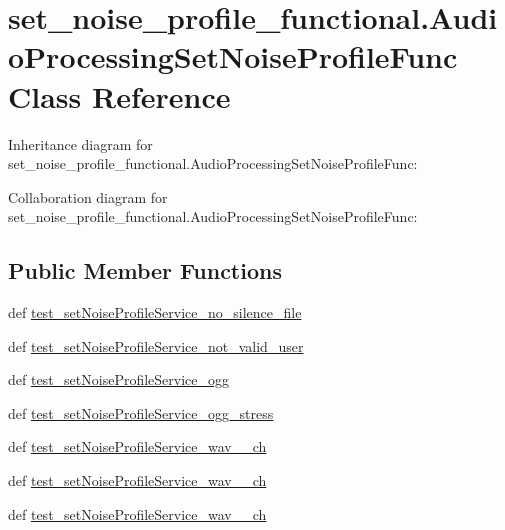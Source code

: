\hypertarget{classset__noise__profile__functional_1_1AudioProcessingSetNoiseProfileFunc}{\section{set\-\_\-noise\-\_\-profile\-\_\-functional.\-Audio\-Processing\-Set\-Noise\-Profile\-Func Class Reference}
\label{classset__noise__profile__functional_1_1AudioProcessingSetNoiseProfileFunc}
}


Inheritance diagram for set\-\_\-noise\-\_\-profile\-\_\-functional.\-Audio\-Processing\-Set\-Noise\-Profile\-Func\-:


Collaboration diagram for set\-\_\-noise\-\_\-profile\-\_\-functional.\-Audio\-Processing\-Set\-Noise\-Profile\-Func\-:
\subsection*{Public Member Functions}
\begin{DoxyCompactItemize}
\item 
def \hyperlink{classset__noise__profile__functional_1_1AudioProcessingSetNoiseProfileFunc_a3ef448c951814ca99645f5ff4a85e851}{test\-\_\-set\-Noise\-Profile\-Service\-\_\-no\-\_\-silence\-\_\-file}
\item 
def \hyperlink{classset__noise__profile__functional_1_1AudioProcessingSetNoiseProfileFunc_a93b5d6356e18f6dc8ebd930d35c2192b}{test\-\_\-set\-Noise\-Profile\-Service\-\_\-not\-\_\-valid\-\_\-user}
\item 
def \hyperlink{classset__noise__profile__functional_1_1AudioProcessingSetNoiseProfileFunc_ad2eae45e356d7e357a61cf063282b436}{test\-\_\-set\-Noise\-Profile\-Service\-\_\-ogg}
\item 
def \hyperlink{classset__noise__profile__functional_1_1AudioProcessingSetNoiseProfileFunc_a488cabdfe725f1a993a42b7d8c6776d0}{test\-\_\-set\-Noise\-Profile\-Service\-\_\-ogg\-\_\-stress}
\item 
def \hyperlink{classset__noise__profile__functional_1_1AudioProcessingSetNoiseProfileFunc_a0e02d0dbae0d788d73b8170a9d48650b}{test\-\_\-set\-Noise\-Profile\-Service\-\_\-wav\-\_\-\_\-ch}
\item 
def \hyperlink{classset__noise__profile__functional_1_1AudioProcessingSetNoiseProfileFunc_a84cd05103322edf9ed9290785b3493b4}{test\-\_\-set\-Noise\-Profile\-Service\-\_\-wav\-\_\-\_\-ch}
\item 
def \hyperlink{classset__noise__profile__functional_1_1AudioProcessingSetNoiseProfileFunc_a263ecbeb3db73f82958ef45b68a9db30}{test\-\_\-set\-Noise\-Profile\-Service\-\_\-wav\-\_\-\_\-ch}
\end{DoxyCompactItemize}


